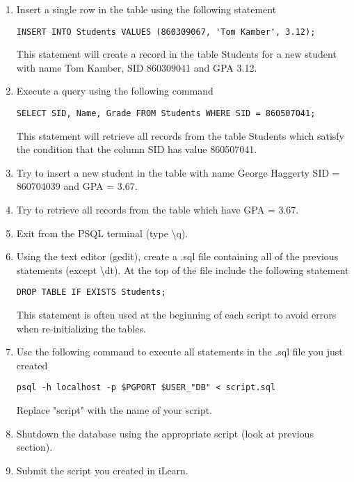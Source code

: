 \documentclass[12pt,a4paper]{article}
\begin{document}
\begin{enumerate}
	\item Insert a single row in the table using the following statement
		\begin{lstlisting}
INSERT INTO Students VALUES (860309067, 'Tom Kamber', 3.12);
	\end{lstlisting}
This statement will create a record in the table Students for a new student with name Tom Kamber, SID 860309041 and GPA 3.12.

	\item Execute a query using the following command
	\begin{lstlisting}
SELECT SID, Name, Grade FROM Students WHERE SID = 860507041;
	\end{lstlisting}
This statement will retrieve all records from the table Students which satisfy the condition that the column SID has value 860507041.
	
	\item Try to insert a new student in the table with name George Haggerty SID = 860704039 and GPA = 3.67.
	
	\item Try to retrieve all records from the table which have GPA = 3.67.

	\item Exit from the PSQL terminal (type \textbackslash q).
	
	\item Using the text editor (gedit), create a .sql file containing all of the previous statements (except \textbackslash dt). At the top of the file include the following statement
		\begin{lstlisting}
DROP TABLE IF EXISTS Students;
	\end{lstlisting}
	
	This statement is often used at the beginning of each script to avoid errors when re-initializing the tables.
	
	\item Use the following command to execute all statements in the .sql file you just created
	\begin{lstlisting}
psql -h localhost -p $PGPORT $USER_"DB" < script.sql
	\end{lstlisting}
	
	Replace "script" with the name of your script.
	
	\item Shutdown the database using the appropriate script (look at previous section).
	
	\item Submit the script you created in iLearn.
	
\end{enumerate}
\end{document}
